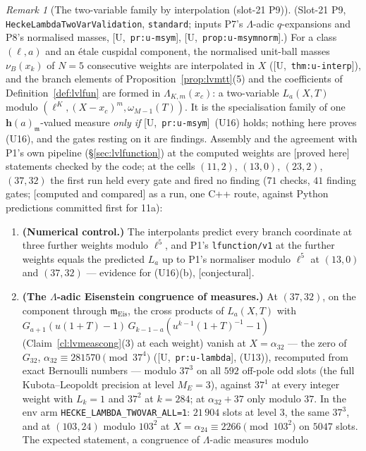 \documentclass[11pt]{article}
\theoremstyle{remark}
\newtheorem{remark}[theorem]{Remark}
\newcommand{\m}{\mathfrak{m}}
\newcommand{\PROVED}{\textsf{[proved here]}}
\newcommand{\CONJ}{\textsf{[conjectural]}}
\newcommand{\CMPD}{\textsf{[computed and compared]}}   %
\newcommand{\Ucite}[1]{[U,~\texttt{#1}]}               %
\begin{document}
\begin{remark}[The two-variable family by interpolation (slot-21 P9)]\label{rmk:lvtwovar}
(Slot-21 P9, \texttt{HeckeLambdaTwoVarValidation}, \texttt{standard}; inputs P7's $\Lambda$-adic $q$-expansions and P8's normalised masses, \Ucite{pr:u-msym}, \Ucite{prop:u-msymnorm}.) For a class
$(\ell,a)$ and an étale cuspidal component, the normalised unit-ball masses $\nu_B(x_k)$ of $N=5$ consecutive weights are interpolated in $X$ (\Ucite{thm:u-interp}), and the branch
elements of Proposition~\ref{prop:lvmtt}(5) and the coefficients of Definition~\ref{def:lvlfun} are formed in $\Lambda_{K,m}(x_c)$: a two-variable $L_a(X,T)$ modulo $(\ell^{K},(X-x_c)^{m},\omega_{M-1}(T))$.
It is the specialisation family of one $\mathbf h(a)_\m$-valued measure \emph{only if} \Ucite{pr:u-msym}~(U16) holds; nothing here proves (U16), and the gates resting on it are findings. Assembly
and the agreement with P1's own pipeline (\S\ref{sec:lvlfunction}) at the computed weights are \PROVED{} statements checked by the code; at the cells $(11,2)$, $(13,0)$, $(23,2)$, $(37,32)$ the
first run held every gate and fired no finding ($71$ checks, $41$ finding gates; \CMPD{} as a run, one C++ route, against Python predictions committed first for 11a):
\begin{enumerate}
\item \textbf{(Numerical control.)} The interpolants predict every branch coordinate at three further weights modulo $\ell^{5}$, and P1's \texttt{lfunction/v1} at the further weights equals
  the predicted $L_a$ up to P1's normaliser modulo $\ell^{5}$ at $(13,0)$ and $(37,32)$ --- evidence for (U16)(b), \CONJ.
\item \textbf{(The $\Lambda$-adic Eisenstein congruence of measures.)} At $(37,32)$, on the component through $\m_{\mathrm{Eis}}$, the cross products of $L_a(X,T)$ with
  $G_{a+1}(u(1+T)-1)\,G_{k-1-a}(u^{k-1}(1+T)^{-1}-1)$ (Claim~\ref{cl:lvmeascong}(3) at each weight) vanish at $X=\alpha_{32}$ --- the zero of $G_{32}$, $\alpha_{32}\equiv281570\pmod{37^{4}}$
  (\Ucite{pr:u-lambda}, (U13)), recomputed from exact Bernoulli numbers --- modulo $37^{3}$ on all $592$ off-pole odd slots (the full Kubota--Leopoldt precision at level $M_E=3$), against
  $37^{1}$ at every integer weight with $L_k=1$ and $37^{2}$ at $k=284$; at $\alpha_{32}+37$ only modulo $37$. In the env arm \texttt{HECKE\_LAMBDA\_TWOVAR\_ALL=1}: $21\,904$ slots at level $3$,
  the same $37^{3}$, and at $(103,24)$ modulo $103^{2}$ at $X=\alpha_{24}\equiv2266\pmod{103^{2}}$ on $5047$ slots. The expected statement, a congruence of $\Lambda$-adic measures modulo

\end{enumerate}
\end{remark}
\end{document}
